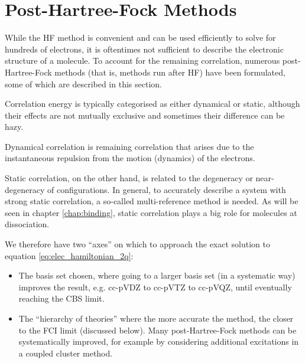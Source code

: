 \section{Post-Hartree-Fock Methods}
\label{sec:post-hf}

While the \gls{HF} method is convenient and can be used efficiently to solve for hundreds of electrons, it is oftentimes not sufficient to describe the electronic structure of a molecule. To account for the remaining correlation, numerous post-Hartree-Fock methods (that is, methods run after \gls{HF}) have been formulated, some of which are described in this section.

Correlation energy is typically categorised as either dynamical or static, although their effects are not mutually exclusive and sometimes their difference can be hazy.

Dynamical correlation is remaining correlation that arises due to the instantaneous repulsion from the motion (dynamics) of the electrons.

Static correlation, on the other hand, is related to the degeneracy or near-degeneracy of configurations. In general, to accurately describe a system with strong static correlation, a so-called multi-reference method is needed. As will be seen in chapter \ref{chap:binding}, static correlation plays a big role for molecules at dissociation.

We therefore have two ``axes'' on which to approach the exact solution to equation \eqref{eq:elec_hamiltonian_2q}:
\begin{itemize}
    \item The basis set chosen, where going to a larger basis set (in a systematic way) improves the result, e.g. cc-pVDZ to cc-pVTZ to cc-pVQZ, until eventually reaching the \gls{CBS} limit.
    \item The ``hierarchy of theories'' where the more accurate the method, the closer to the \gls{FCI} limit (discussed below). Many post-Hartree-Fock methods can be systematically improved, for example by considering additional excitations in a coupled cluster method.
\end{itemize}

